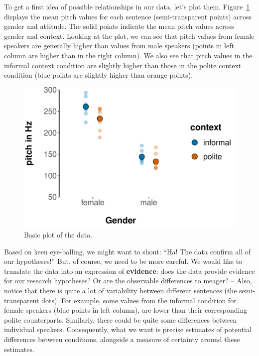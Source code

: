 \documentclass[nobib]{tufte-handout}
\begin{document}
To get a first idea of possible relationships in our data, let's plot
them. Figure~\ref{fig:BasicPlotData_data} displays the mean pitch values for each
sentence (semi-transparent points) across gender and attitude. The solid points indicate the
mean pitch values across gender and context. Looking at the plot, we can see that pitch values
from female speakers are generally higher than values from male speakers (points in left column
are higher than in the right column). We also see that pitch values in the informal context
condition are slightly higher than those in the polite context condition (blue points are
slightly higher than orange points).

\begin{figure}[t]
  \centering
    \includegraphics[width = \textwidth]{pics/basic_data_plot.pdf}
    \caption{Basic plot of the data.}
     \label{fig:BasicPlotData_data}
\end{figure}

Based on keen eye-balling, we might want to shout: ``Ha! The data confirm all of our
hypotheses!'' But, of course, we need to be more careful. We would like to translate the data
into an expression of \textbf{evidence}: does the data provide evidence for our research
hypotheses? Or are the observable differences to meager? -- Also, notice that there is quite a
lot of variability between different sentences (the semi-transparent dots). For example, some
values from the informal condition for female speakers (blue points in left column), are lower
than their corresponding polite counterparts. Similarly, there could be quite some differences
between individual speakers. Consequently, what we want is precise estimates of potential
differences between conditions, alongside a measure of certainty around these estimates.
\end{document}
